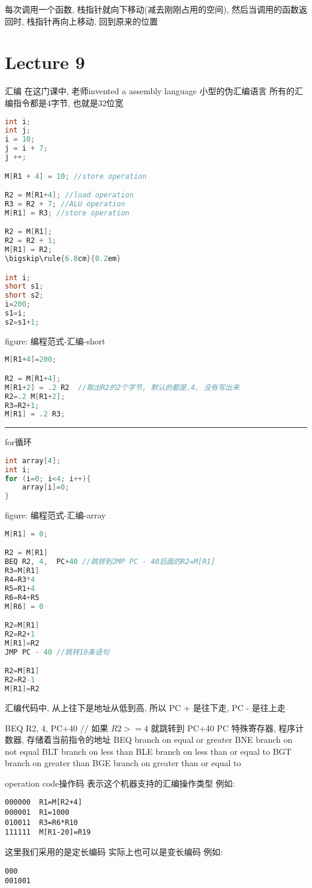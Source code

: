 \documentclass{article}
\begin{document}
每次调用一个函数, 栈指针就向下移动(减去刚刚占用的空间), 然后当调用的函数返回时, 栈指针再向上移动, 回到原来的位置

\section{Lecture 9}
汇编
在这门课中, 老师invented a assembly language
小型的伪汇编语言
所有的汇编指令都是4字节, 也就是32位宽

\begin{lstlisting}[language = C]
int i;
int j;
i = 10;
j = i + 7;
j ++;

M[R1 + 4] = 10; //store operation

R2 = M[R1+4]; //load operation
R3 = R2 + 7; //ALU operation
M[R1] = R3; //store operation

R2 = M[R1];
R2 = R2 + 1; 
M[R1] = R2;
\bigskip\rule{6.8cm}{0.2em}

int i;
short s1;
short s2;
i=200;
s1=i;
s2=s1+1;
\end{lstlisting}
figure: 编程范式-汇编-short
 

\begin{lstlisting}[language = C]
M[R1+4]=200;

R2 = M[R1+4];
M[R1+2] = .2 R2  //取出R2的2个字节, 默认的都是.4, 没有写出来
R2=.2 M[R1+2];
R3=R2+1;
M[R1] = .2 R3;
\end{lstlisting}
\bigskip\rule{6.8cm}{0.2em}
for循环
\begin{lstlisting}[language = C]
int array[4];
int i;
for (i=0; i<4; i++){
	array[i]=0;
}
\end{lstlisting}
figure: 编程范式-汇编-array
 
\begin{lstlisting}[language = C]
M[R1] = 0;

R2 = M[R1]
BEQ R2, 4,  PC+40 //跳转到JMP PC - 40后面的R2=M[R1]
R3=M[R1]
R4=R3*4
R5=R1+4
R6=R4+R5
M[R6] = 0

R2=M[R1]
R2=R2+1
M[R1]=R2
JMP PC - 40 //跳转10条语句

R2=M[R1]
R2=R2-1
M[R1]=R2
\end{lstlisting}
汇编代码中, 从上往下是地址从低到高, 所以 PC + 是往下走, PC - 是往上走

BEQ R2, 4,  PC+40  // 如果 $R2 >=4$ 就跳转到 PC+40
PC 特殊寄存器, 程序计数器, 存储着当前指令的地址
BEQ  branch on equal or greater
BNE branch on not equal
BLT branch on less than
BLE branch on less than or equal to
BGT branch on greater than
BGE branch on greater than or equal to

operation code操作码
表示这个机器支持的汇编操作类型
例如:
\begin{verbatim}
000000	R1=M[R2+4]
000001	R1=1000
010011	R3=R6*R10
111111	M[R1-20]=R19
\end{verbatim}
这里我们采用的是定长编码
实际上也可以是变长编码
例如:
\begin{verbatim}
000
001001
\end{verbatim}
\end{document}
